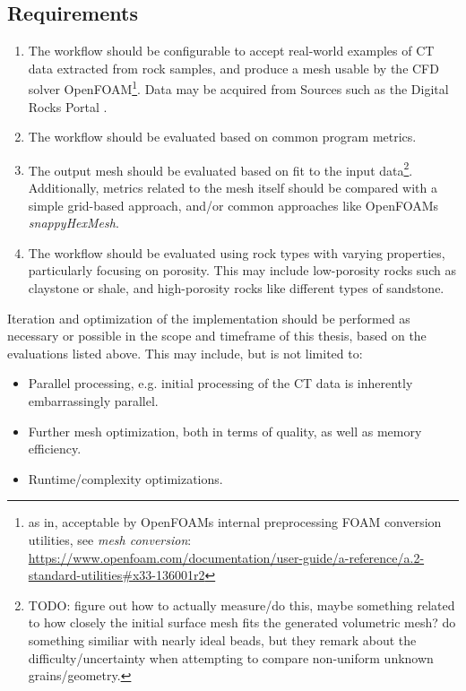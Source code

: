 \documentclass[
	ngerman,
	accentcolor=9c,
	type=intern,
	marginpar=false
	]{tudapub}
\begin{document}
\subsection{Requirements}
\begin{enumerate}
	\item The workflow should be configurable to accept real-world examples of CT data extracted from rock samples, and produce a mesh usable by the CFD solver OpenFOAM\footnote{as in, acceptable by OpenFOAMs internal preprocessing FOAM conversion utilities, see \textit{mesh conversion}: \url{https://www.openfoam.com/documentation/user-guide/a-reference/a.2-standard-utilities\#x33-136001r2}}. Data may be acquired from Sources such as the Digital Rocks Portal \cite{prodanovic_digital_2015}.
	\item The workflow should be evaluated based on common program metrics.
	\item The output mesh should be evaluated based on fit to the input data\footnote{TODO: figure out how to actually measure/do this, maybe something related to how closely the initial surface mesh fits the generated volumetric mesh? \citeauthor{hammouti_error_2024} do something similiar with nearly ideal beads, but they remark about the difficulty/uncertainty when attempting to compare non-uniform unknown grains/geometry.}. Additionally, metrics related to the mesh itself should be compared with a simple grid-based approach, and/or common approaches like OpenFOAMs \textit{snappyHexMesh}.
	\item The workflow should be evaluated using rock types with varying properties, particularly focusing on porosity. This may include low-porosity rocks such as claystone or shale, and high-porosity rocks like different types of sandstone.
\end{enumerate}

Iteration and optimization of the implementation should be performed as necessary or possible in the scope and timeframe of this thesis, based on the evaluations listed above. This may include, but is not limited to:
\begin{itemize}
	\item Parallel processing, e.g. initial processing of the CT data is inherently embarrassingly parallel.
	\item Further mesh optimization, both in terms of quality, as well as memory efficiency.
	\item Runtime/complexity optimizations.
\end{itemize}

\newpage
\printbibliography
\end{document}
